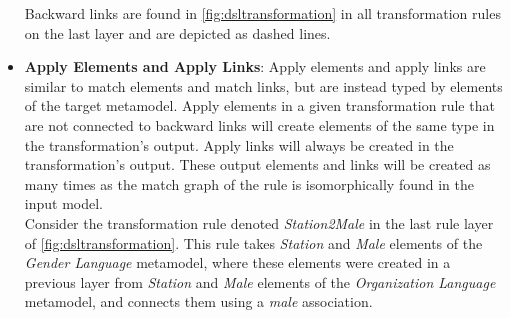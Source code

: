 \begin{itemize}
Backward links are found in \cref{fig:dsltransformation} in all transformation rules on the last layer and are depicted as dashed lines.\\


\item \textbf{Apply Elements and Apply Links}: Apply elements and apply links are similar to match elements and
match links, but are instead typed by elements of the target metamodel. Apply elements in a given transformation rule that are not connected to backward links will create elements of the same type in the transformation's output. Apply links will always be created in the transformation's output. These output elements and links will be created as many times as the match graph of the rule is isomorphically found in the input model.\\

Consider the transformation rule denoted \emph{Station2Male} in the last rule
layer of \cref{fig:dsltransformation}. This rule takes \emph{Station} and
\emph{Male} elements of the \emph{Gender Language} metamodel, where these
elements were created in a previous layer from \emph{Station} and \emph{Male}
elements of the \emph{Organization Language} metamodel, and connects them using a
\emph{male} association.

\end{itemize}


